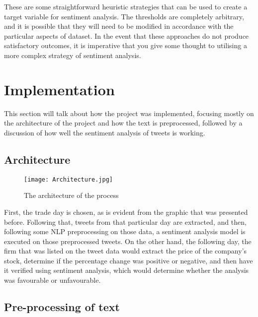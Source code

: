 \documentclass[12pt, a4paper,twoside]{report}
\theoremstyle{plain} %
\theoremstyle{definition} %
\theoremstyle{remark} %
\numberwithin{equation}{chapter}
\begin{document}
These are some straightforward heuristic strategies that can be used to create a target variable for sentiment analysis. The thresholds are completely arbitrary, and it is possible that they will need to be modified in accordance with the particular aspects of dataset. In the event that these approaches do not produce satisfactory outcomes, it is imperative that you give some thought to utilising a more complex strategy of sentiment analysis.

    
\chapter{Implementation }\label{ch:4}
    This section will talk about how the project was implemented, focusing mostly on the architecture of the project and how the text is preprocessed, followed by a discussion of how well the sentiment analysis of tweets is working.
    
    \section{Architecture}
    \begin{figure}
        \centering
        \texttt{[image: Architecture.jpg]}
        \caption{The architecture of the process}
        \label{fig:enter-label}
    \end{figure}
    First, the trade day is chosen, as is evident from the graphic that was presented before. Following that, tweets from that particular day are extracted, and then, following some NLP preprocessing on those data, a sentiment analysis model is executed on those preprocessed tweets. On the other hand, the following day, the firm that was listed on the tweet data would extract the price of the company's stock, determine if the percentage change was positive or negative, and then have it verified using sentiment analysis, which would determine whether the analysis was favourable or unfavourable.

    
    
    \section{Pre-processing of text}
    
\end{document}

